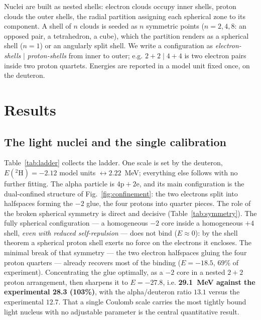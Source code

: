 \documentclass[11pt]{article}
\begin{document}
Nuclei are built as nested shells: electron clouds occupy inner shells, proton clouds the outer
shells, the radial partition assigning each spherical zone to its component. A shell of $n$
clouds is seeded as $n$ symmetric points ($n=2,4,8$: an opposed pair, a tetrahedron, a cube),
which the partition renders as a spherical shell ($n=1$) or an angularly split shell. We write
a configuration as \emph{electron-shells} $\mid$ \emph{proton-shells} from inner to outer; e.g.
$2{+}2\mid 4{+}4$ is two electron pairs inside two proton quartets. Energies are reported in a
model unit fixed once, on the deuteron.

\section{Results}

\subsection{The light nuclei and the single calibration}

Table~\ref{tab:ladder} collects the ladder. One scale is set by the deuteron,
$E(^2\mathrm{H})=-2.12$ model units $\leftrightarrow 2.22$~MeV; everything else follows with no
further fitting. The alpha particle is $\mathrm{4p}+\mathrm{2e}$, and its main configuration is
the dual-confined structure of Fig.~\ref{fig:confinement}: the two electrons split into halfspaces
forming the $-2$ glue, the four protons into quarter pieces. The role of the broken spherical
symmetry is direct and decisive (Table~\ref{tab:symmetry}). The fully spherical configuration ---
a homogeneous $-2$ core inside a homogeneous $+4$ shell, \emph{even with reduced self-repulsion}
--- does not bind ($E\approx 0$): by the shell theorem a spherical proton shell exerts no force on
the electrons it encloses. The minimal break of that symmetry --- the two electron halfspaces
gluing the four proton quarters --- already recovers most of the binding ($E=-18.5$, $69\%$ of
experiment). Concentrating the glue optimally, as a $-2$ core in a nested $2{+}2$ proton
arrangement, then sharpens it to $E=-27.8$, i.e. \textbf{29.1~MeV against the experimental 28.3
(103\%)}, with the alpha/deuteron ratio $13.1$ versus the experimental $12.7$. That a single
Coulomb scale carries the most tightly bound light nucleus with no adjustable parameter is the
central quantitative result.
\end{document}
